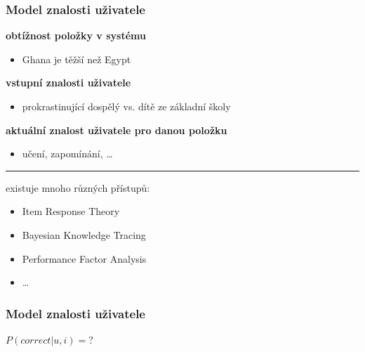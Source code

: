 \documentclass[xcolor=svgnames]{beamer}
\begin{document}
\begin{frame}
	\frametitle{Model znalosti uživatele}
	\textbf{obtížnost položky v systému}
	\begin{itemize}
		\item Ghana je těžší než Egypt
	\end{itemize}
	\textbf{vstupní znalosti uživatele}
	\begin{itemize}
		\item prokrastinující dospělý vs. dítě ze základní školy
	\end{itemize}
	\textbf{aktuální znalost uživatele pro danou položku}
	\begin{itemize}
		\item učení, zapomínání, \ldots
	\end{itemize}

	\pause
	\bigskip
	\hrule

	\medskip
	existuje mnoho různých přístupů:
	\begin{itemize}
		\item Item Response Theory
		\item Bayesian Knowledge Tracing
		\item Performance Factor Analysis
		\item \ldots
	\end{itemize}
\end{frame}
\begin{frame}
	\frametitle{Model znalosti uživatele}
	\begin{center}
	{\Huge $P(correct|u, i) = ?$}
	\end{center}
\end{frame}
\end{document}
